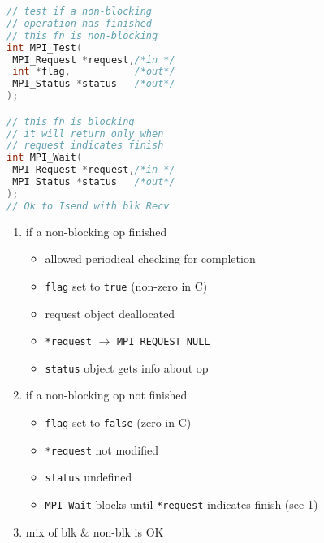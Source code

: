 \begin{minipage}{0.5\linewidth}
\begin{lstlisting}[language=c,xrightmargin=2pt]
// test if a non-blocking
// operation has finished
// this fn is non-blocking
int MPI_Test(
 MPI_Request *request,/*in */
 int *flag,           /*out*/
 MPI_Status *status   /*out*/
);

// this fn is blocking
// it will return only when
// request indicates finish
int MPI_Wait(
 MPI_Request *request,/*in */
 MPI_Status *status   /*out*/
);
// Ok to Isend with blk Recv
\end{lstlisting}
\end{minipage}
\begin{minipage}{0.5\linewidth}
  \flushleft
  \begin{enumerate}[leftmargin=.8em]
  \item if a non-blocking op finished
    \begin{itemize}
    \item allowed periodical checking for completion
    \item \texttt{flag} set to \texttt{true} (non-zero in C)
    \item request object deallocated
    \item \texttt{*request} $\rightarrow$ \texttt{MPI\_REQUEST\_NULL}
    \item \texttt{status} object gets info about op
    \end{itemize}
  \item if a non-blocking op not finished
    \begin{itemize}
    \item \texttt{flag} set to \texttt{false} (zero in C)
    \item \texttt{*request} not modified
    \item \texttt{status} undefined
    \item \texttt{MPI\_Wait} blocks until \texttt{*request} indicates finish (see 1)
    \end{itemize}
  \item mix of blk \& non-blk is OK
  \end{enumerate}
\end{minipage}

